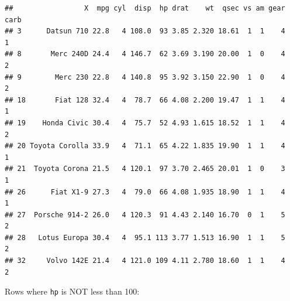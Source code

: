 \documentclass[
]{article}
\newenvironment{Shaded}{\begin{snugshade}}{\end{snugshade}}
\newcommand{\DecValTok}[1]{\textcolor[rgb]{0.00,0.00,0.81}{#1}}
\newcommand{\NormalTok}[1]{#1}
\newcommand{\SpecialCharTok}[1]{\textcolor[rgb]{0.81,0.36,0.00}{\textbf{#1}}}
\begin{document}
\begin{verbatim}
##                 X  mpg cyl  disp  hp drat    wt  qsec vs am gear carb
## 3      Datsun 710 22.8   4 108.0  93 3.85 2.320 18.61  1  1    4    1
## 8       Merc 240D 24.4   4 146.7  62 3.69 3.190 20.00  1  0    4    2
## 9        Merc 230 22.8   4 140.8  95 3.92 3.150 22.90  1  0    4    2
## 18       Fiat 128 32.4   4  78.7  66 4.08 2.200 19.47  1  1    4    1
## 19    Honda Civic 30.4   4  75.7  52 4.93 1.615 18.52  1  1    4    2
## 20 Toyota Corolla 33.9   4  71.1  65 4.22 1.835 19.90  1  1    4    1
## 21  Toyota Corona 21.5   4 120.1  97 3.70 2.465 20.01  1  0    3    1
## 26      Fiat X1-9 27.3   4  79.0  66 4.08 1.935 18.90  1  1    4    1
## 27  Porsche 914-2 26.0   4 120.3  91 4.43 2.140 16.70  0  1    5    2
## 28   Lotus Europa 30.4   4  95.1 113 3.77 1.513 16.90  1  1    5    2
## 32     Volvo 142E 21.4   4 121.0 109 4.11 2.780 18.60  1  1    4    2
\end{verbatim}

Rows where \texttt{hp} is NOT less than 100:

\begin{Shaded}
\end{Shaded}
\end{document}
